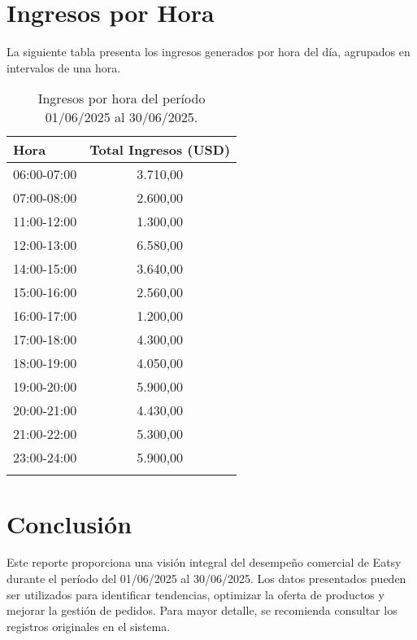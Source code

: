 \documentclass[a4paper,11pt]{article}
\begin{document}
\section{Ingresos por Hora}
La siguiente tabla presenta los ingresos generados por hora del día, agrupados en intervalos de una hora.

\begin{longtable}{lc}
    \toprule
    \textbf{Hora} & \textbf{Total Ingresos (USD)} \\
    \midrule
            06:00-07:00 & 3.710,00 \\
            07:00-08:00 & 2.600,00 \\
            11:00-12:00 & 1.300,00 \\
            12:00-13:00 & 6.580,00 \\
            14:00-15:00 & 3.640,00 \\
            15:00-16:00 & 2.560,00 \\
            16:00-17:00 & 1.200,00 \\
            17:00-18:00 & 4.300,00 \\
            18:00-19:00 & 4.050,00 \\
            19:00-20:00 & 5.900,00 \\
            20:00-21:00 & 4.430,00 \\
            21:00-22:00 & 5.300,00 \\
            23:00-24:00 & 5.900,00 \\
        \bottomrule
    \caption{Ingresos por hora del período 01/06/2025 al 30/06/2025.}
    \label{tab:ingresos_por_hora}
\end{longtable}

\section{Conclusión}
Este reporte proporciona una visión integral del desempeño comercial de Eatsy durante el período del 01/06/2025 al 30/06/2025. Los datos presentados pueden ser utilizados para identificar tendencias, optimizar la oferta de productos y mejorar la gestión de pedidos. Para mayor detalle, se recomienda consultar los registros originales en el sistema.
\end{document}

